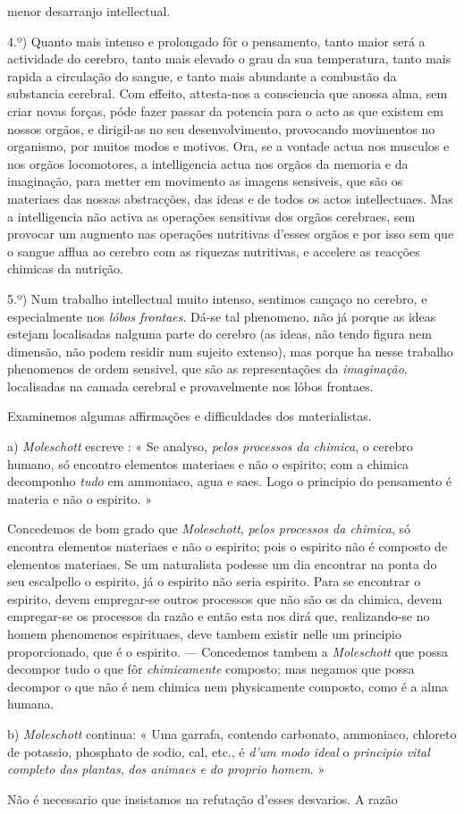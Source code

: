 menor desarranjo intellectual.\par 4.º) Quanto mais intenso e prolongado fôr o pensamento, tanto maior será a actividade do cerebro, tanto mais elevado o grau da sua temperatura, tanto mais rapida a circulação do sangue, e tanto mais abundante a combustão da substancia cerebral. Com effeito, attesta-nos a consciencia que anossa alma, sem criar novas forças, póde fazer passar da potencia para o acto as que existem em nossos orgãos, e dirigil-as no seu desenvolvimento, provocando movimentos no organismo, por muitos modos e motivos. Ora, se a vontade actua nos musculos e nos orgãos locomotores, a intelligencia actua nos orgãos da memoria e da imaginação, para metter em movimento as imagens sensiveis, que são os materiaes das nossas abstracções, das ideas e de todos os actos intellectuaes. Mas a intelligencia não activa as operações sensitivas dos orgãos cerebraes, sem provocar um augmento nas operações nutritivas d'esses orgãos e por isso sem que o sangue afflua ao cerebro com as riquezas nutritivas, e accelere as reacções chimicas da nutrição.\par 5.º) Num trabalho intellectual muito intenso, sentimos cançaço no cerebro, e especialmente nos \emph{lóbos frontaes}. Dá-se tal phenomeno, não já porque as ideas estejam localisadas nalguma parte do cerebro (as ideas, não tendo figura nem dimensão, não podem residir num sujeito extenso), mas porque ha nesse trabalho phenomenos de ordem sensivel, que são as representações da \emph{imaginação}, localisadas na camada cerebral e provavelmente nos lóbos frontaes.\par Examinemos algumas affirmações e difficuldades dos materialistas.\par a) \emph{Moleschott} escreve : « Se analyso, \emph{pelos processos da chimica}, o cerebro humano, só encontro elementos materiaes e não o espirito; com a chimica decomponho \emph{tudo} em ammoniaco, agua e saes. Logo o principio do pensamento é materia e não o espirito. »\par Concedemos de bom grado que \emph{Moleschott}, \emph{pelos processos da chimica}, só encontra elementos materiaes e não o espirito; pois o espirito não é composto de elementos materiaes. Se um naturalista podesse um dia encontrar na ponta do seu escalpello o espirito, já o espirito não seria espirito. Para se encontrar o espirito, devem empregar-se outros processos que não são os da chimica, devem empregar-se os processos da razão e então esta nos dirá que, realizando-se no homem phenomenos espirituaes, deve tambem existir nelle um principio proporcionado, que é o espirito. --- Concedemos tambem a \emph{Moleschott} que possa decompor tudo o que fôr \emph{chimicamente} composto; mas negamos que possa decompor o que não é nem chimica nem physicamente composto, como é a alma humana.\par b) \emph{Moleschott} continua: « Uma garrafa, contendo carbonato, ammoniaco, chloreto de potassio, phosphato de sodio, cal, etc., é \emph{d'um modo ideal} o \emph{principio vital completo das plantas}, \emph{dos animaes e do proprio homem}. »\par Não é necessario que insistamos na refutação d'esses desvarios. A razão 